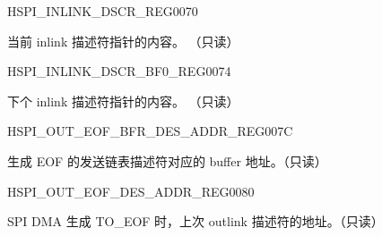 \begin{register}{H}{SPI\_INLINK\_DSCR\_REG}{\hexprefix{}0070}\label{regdesc:SPIINLINKDSCRREG}
%
\regnewline%
\begin{regdesc}\begin{reglist}
\label{fielddesc:SPIDMAINLINKDSCR}\item [SPI\_DMA\_INLINK\_DSCR] 当前 inlink 描述符指针的内容。 （只读）
\end{reglist}\end{regdesc}
\end{register}


\begin{register}{H}{SPI\_INLINK\_DSCR\_BF0\_REG}{\hexprefix{}0074}\label{regdesc:SPIINLINKDSCRBF0REG}
%
\regnewline%
\begin{regdesc}\begin{reglist}
\label{fielddesc:SPIDMAINLINKDSCRBF0}\item [SPI\_DMA\_INLINK\_DSCR\_BF0] 下个 inlink 描述符指针的内容。 （只读）
\end{reglist}\end{regdesc}
\end{register}


\begin{register}{H}{SPI\_OUT\_EOF\_BFR\_DES\_ADDR\_REG}{\hexprefix{}007C}\label{regdesc:SPIOUTEOFBFRDESADDRREG}
%
\regnewline%
\begin{regdesc}\begin{reglist}
\label{fielddesc:SPIDMAOUTEOFBFRDESADDR}\item [SPI\_DMA\_OUT\_EOF\_BFR\_DES\_ADDR] 生成 EOF 的发送链表描述符对应的 buffer 地址。（只读）
\end{reglist}\end{regdesc}
\end{register}


\begin{register}{H}{SPI\_OUT\_EOF\_DES\_ADDR\_REG}{\hexprefix{}0080}\label{regdesc:SPIOUTEOFDESADDRREG}
%
\regnewline%
\begin{regdesc}\begin{reglist}
\label{fielddesc:SPIDMAOUTEOFDESADDR}\item [SPI\_DMA\_OUT\_EOF\_DES\_ADDR] SPI DMA 生成 TO\_EOF 时，上次 outlink 描述符的地址。（只读）
\end{reglist}\end{regdesc}
\end{register}


